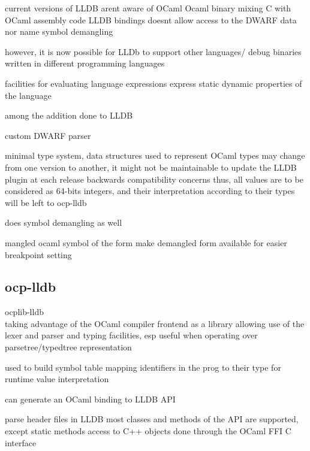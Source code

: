 current versions of LLDB arent aware of OCaml
Ocaml binary mixing C with OCaml assembly code
LLDB bindings doesnt allow access to the DWARF data nor name symbol demangling

however, it is now possible for LLDb to support other languages/ debug binaries
written in different programming languages

facilities for evaluating language expressions
express static dynamic properties of the language

among the addition done to LLDB

custom DWARF parser

minimal type system, data structures used to represent OCaml types may
    change from one version to another, it might not be maintainable to update
    the LLDB plugin at each release
    backwards compatibility concerns
    thus, all values are to be considered as 64-bits integers, and their
    interpretation according to their types will be left to ocp-lldb

    does symbol demangling as well

    mangled ocaml symbol of the form
    make demangled form available for easier breakpoint setting


\subsection{ocp-lldb}

ocplib-lldb \\

taking advantage of the OCaml compiler frontend as a library
allowing use of the lexer and parser and typing facilities, esp
useful when operating over parsetree/typedtree representation

used to build symbol table mapping identifiers in the prog to their type
for runtime value interpretation

can generate an OCaml binding to LLDB API

parse header files in LLDB
most classes and methods of the API are supported, except static methods
access to C++ objects done through the OCaml FFI C interface


